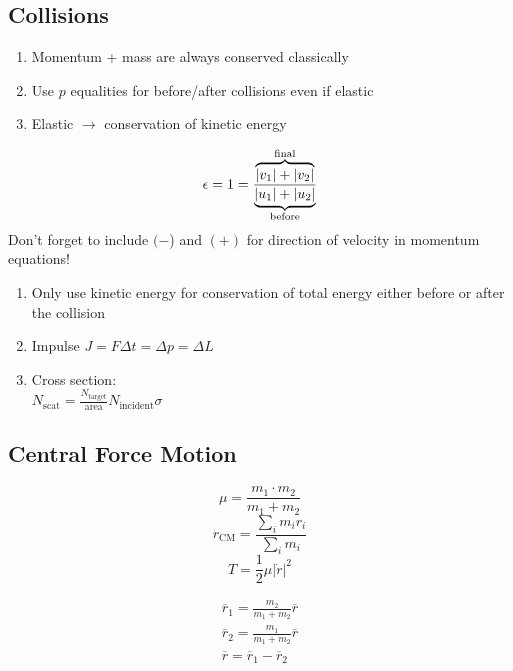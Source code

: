 \documentclass[10pt,a4paper]{article}
\begin{document}
\subsection{Collisions}
\begin{enumerate}
    \item Momentum + mass are always conserved classically
    \item Use $p$ equalities for before/after collisions even if elastic
    \item Elastic $\rightarrow$ conservation of kinetic energy
\end{enumerate}
\begin{equation}
\epsilon = 1 = \frac{\overbrace{|v_1| + |v_2|}^{\mathclap{\textrm{final}}}}{\underbrace{|u_1| + |u_2|}_{\mathclap{\textrm{before}}}}
\end{equation}
Don't forget to include $(-$) and $(+)$ for direction of velocity in momentum equations!
\begin{enumerate}
    \item Only use kinetic energy for conservation of total energy either before or after the collision
    \item Impulse $J = F \Delta t = \Delta p = \Delta L$
    \item Cross section:\\
    $N_\textrm{scat} = \frac{N_\textrm{target}}{\textrm{area}}N_\textrm{incident} \sigma$
\end{enumerate}

\subsection{Central Force Motion}
\begin{equation}
    \mu = \frac{m_1 \cdot m_2}{m_1 + m_2}
\end{equation}
\begin{equation}
    r_{\textrm{CM}} = \frac{\sum \limits_i m_i r_i}{\sum \limits_i m_i}
\end{equation}
\begin{equation}
 T = \frac{1}{2}\mu |\dot{r}|^2
\end{equation}

\begin{align}
    \overline{r}_1 = \frac{m_2}{m_1 + m_2} \overline{r}\\
    \overline{r}_2 = \frac{m_1}{m_1 + m_2} \overline{r}\\
    \overline{r} = \overline{r}_1 - \overline{r}_2
\end{align}
\end{document}
